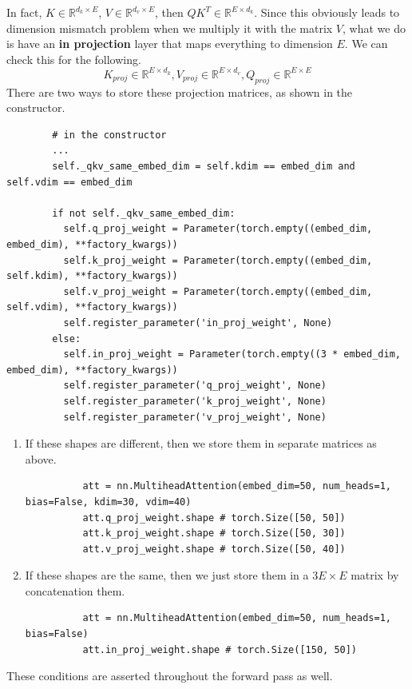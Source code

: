       In fact, $K \in \mathbb{R}^{d_k \times E}$, $V \in \mathbb{R}^{d_v \times E}$, then $QK^T \in \mathbb{R}^{E \times d_k}$. Since this obviously leads to dimension mismatch problem when we multiply it with the matrix $V$, what we do is have an \textbf{in projection} layer that maps everything to dimension $E$. We can check this for the following. 
      \begin{equation}
        K_{proj} \in \mathbb{R}^{E \times d_k}, V_{proj} \in \mathbb{R}^{E \times d_v}, Q_{proj} \in \mathbb{R}^{E \times E}
      \end{equation}
      There are two ways to store these projection matrices, as shown in the constructor. 
      \begin{lstlisting}
        # in the constructor 
        ...
        self._qkv_same_embed_dim = self.kdim == embed_dim and self.vdim == embed_dim

        if not self._qkv_same_embed_dim:
          self.q_proj_weight = Parameter(torch.empty((embed_dim, embed_dim), **factory_kwargs))
          self.k_proj_weight = Parameter(torch.empty((embed_dim, self.kdim), **factory_kwargs))
          self.v_proj_weight = Parameter(torch.empty((embed_dim, self.vdim), **factory_kwargs))
          self.register_parameter('in_proj_weight', None)
        else:
          self.in_proj_weight = Parameter(torch.empty((3 * embed_dim, embed_dim), **factory_kwargs))
          self.register_parameter('q_proj_weight', None)
          self.register_parameter('k_proj_weight', None)
          self.register_parameter('v_proj_weight', None)
      \end{lstlisting}
      \begin{enumerate}
        \item If these shapes are different, then we store them in separate matrices as above. 
        \begin{lstlisting}
          att = nn.MultiheadAttention(embed_dim=50, num_heads=1, bias=False, kdim=30, vdim=40) 
          att.q_proj_weight.shape # torch.Size([50, 50])
          att.k_proj_weight.shape # torch.Size([50, 30])
          att.v_proj_weight.shape # torch.Size([50, 40])
        \end{lstlisting}

        \item If these shapes are the same, then we just store them in a $3E \times E$ matrix by concatenation them. 
        \begin{lstlisting}
          att = nn.MultiheadAttention(embed_dim=50, num_heads=1, bias=False) 
          att.in_proj_weight.shape # torch.Size([150, 50])
        \end{lstlisting}
      \end{enumerate}
      These conditions are asserted throughout the forward pass as well.  

